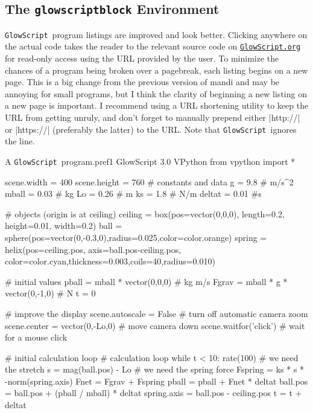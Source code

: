 \documentclass{article}
\newcommand*{\pkg}[1]{\textsf{#1}}                    %
\newcommand*{\GlowScript}{\texttt{GlowScript}}        %
\newcommand*{\GlowScriptorg}{\texttt{GlowScript.org}} %
\begin{document}
\subsection{The \texttt{glowscriptblock} Environment}
\GlowScript\ program listings are improved and look better. Clicking anywhere on the actual 
code takes the reader to the relevant source code on \href{https://www.glowscript.org}{\GlowScriptorg}
for read-only access using the URL provided by the user. To minimize the chances of a program being 
broken over a pagebreak, each listing begins on a new page. This is a big change from the previous 
version of \pkg{mandi} and may be annoying for small programs, but I think the clarity of beginning a
new listing on a new page is important. I recommend using a URL shortening utility to keep the URL
from getting unruly, and don't forget to manually prepend either |http://| or |https://| (preferably
the latter) to the URL. Note that \GlowScript\ ignores the 
 line.

\begin{glowscriptblock}{A \GlowScript\ program.}{pref1}
GlowScript 3.0 VPython
from vpython import *

scene.width = 400
scene.height = 760
# constants and data
g = 9.8       # m/s^2
mball = 0.03  # kg
Lo = 0.26     # m
ks = 1.8      # N/m
deltat = 0.01 #s 

# objects (origin is at ceiling)
ceiling = box(pos=vector(0,0,0), length=0.2, height=0.01, width=0.2)
ball = sphere(pos=vector(0,-0.3,0),radius=0.025,color=color.orange)
spring = helix(pos=ceiling.pos, axis=ball.pos-ceiling.pos,
         color=color.cyan,thickness=0.003,coils=40,radius=0.010)

# initial values
pball = mball * vector(0,0,0)      # kg m/s
Fgrav = mball * g * vector(0,-1,0) # N
t = 0

# improve the display
scene.autoscale = False        # turn off automatic camera zoom
scene.center = vector(0,-Lo,0) # move camera down
scene.waitfor('click')         # wait for a mouse click

# initial calculation loop
# calculation loop
while t < 10:
    rate(100)
    # we need the stretch
    s = mag(ball.pos) - Lo
    # we need the spring force
    Fspring = ks * s * -norm(spring.axis)
    Fnet = Fgrav + Fspring
    pball = pball + Fnet * deltat
    ball.pos = ball.pos + (pball / mball) * deltat
    spring.axis = ball.pos - ceiling.pos
    t = t + deltat
\end{glowscriptblock}
\end{document}
